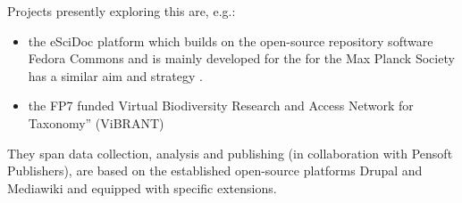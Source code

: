 \documentclass{llncs}
\begin{document}
Projects presently exploring this are, e.g.:

\begin{itemize}
  \item the eSciDoc platform which builds on the open-source
    repository software Fedora Commons \cite{Feudora} and is mainly
    developed for the for the Max Planck Society has a similar aim and
    strategy \cite{Dreyer}.
  \item the FP7 funded Virtual Biodiversity Research and Access
    Network for Taxonomy'' (ViBRANT) \cite{vbrant,Roberts,Blagoderov}
\end{itemize}

They span data collection, analysis and publishing (in collaboration
with Pensoft Publishers), are based on the established open-source
platforms Drupal \cite{Drupal} and Mediawiki \cite{MediaWiki} and
equipped with specific extensions.

\end{document}
